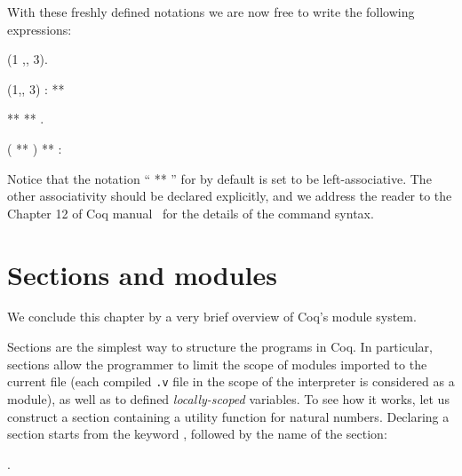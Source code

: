With these freshly defined notations we are now free to write the
following expressions:


\begin{coqdoccode}
\coqdocemptyline
\coqdocnoindent
{} (1 ,, 3).\coqdoceol
\coqdocemptyline
\end{coqdoccode}


\coqdoceol
\coqdocemptyline
\coqdocnoindent
(1,, 3)\coqdoceol
\coqdocindent{2.50em}
:  ** 

\coqdocemptyline


\begin{coqdoccode}
\coqdocnoindent
{}  **  ** .\coqdoceol
\coqdocemptyline
\end{coqdoccode}


\coqdoceol
\coqdocemptyline
\coqdocnoindent
( ** ) ** \coqdoceol
\coqdocindent{2.50em}
: 

\coqdocemptyline


Notice that the notation ``\coqdocvar{\_} ** \coqdocvar{\_}'' for  by default is set to
be left-associative. The other associativity should be declared
explicitly, and we address the reader to the Chapter 12 of Coq
manual~\cite{Coq-manual} for the details of the 
 command syntax.


\section{Sections and modules}


\label{sec:secmod}


We conclude this chapter by a very brief overview of Coq's module
system.


Sections are the simplest way to structure the programs in Coq. In
particular, sections allow the programmer to limit the scope of
modules imported to the current file (each compiled \texttt{.v} file
in the scope of the interpreter is considered as a module), as well as
to defined \textit{locally-scoped} variables. To see how it works, let us
construct a section containing a utility function for natural
numbers.  Declaring a section starts from the keyword
, followed by the name of the section:


 \begin{coqdoccode}
\coqdocemptyline
\coqdocnoindent
{} .\coqdoceol
\coqdocemptyline
\end{coqdoccode}


